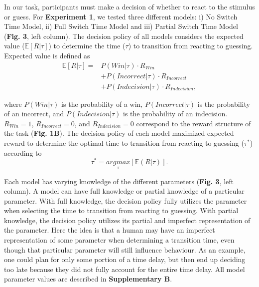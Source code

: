 \documentclass[12pt]{article}
\newcommand\boldblue[1]{\textcolor{mydarkblue}{\textbf{#1}}}
\begin{document}
\noindent In our task, participants must make a decision of whether to react to the stimulus or guess. For \boldblue{Experiment 1}, we tested three different models:  i) No Switch Time Model, ii) Full Switch Time Model and iii) Partial Switch Time Model (\boldblue{Fig. 3}, left column). The decision policy of all models considers the expected value ($\mathbb{E}[R|\tau]$) to determine the time ($\tau$) to transition from reacting to guessing. Expected value is defined as
\setlength{\belowdisplayskip}{4pt} \setlength{\belowdisplayshortskip}{4pt} %
\setlength{\abovedisplayskip}{4pt} \setlength{\abovedisplayshortskip}{4pt}
\begin{align}
    \mathbb{E}[R|\tau] = & P(Win|\tau) \cdot R_{Win} \nonumber \\ &+ P(Incorrect|\tau) \cdot R_{Incorrect} \nonumber \\ &+ P(Indecision|\tau) \cdot R_{Indecision},
\end{align}

\noindent where $P(Win|\tau)$ is the probability of a win, $P(Incorrect|\tau)$ is the probability of an incorrect, and $P(Indecision|\tau)$ is the probability of an indecision. $R_{Win} = 1$, $R_{Incorrect} = 0$, and $R_{Indecision} = 0$ correspond to the reward structure of the task (\boldblue{Fig. 1B}). The decision policy of each model maximized expected reward to determine the optimal time to transition from reacting to guessing ($\tau^*$) according to
\begin{equation}
    \tau^* = \underset{\tau}{argmax}[\mathbb{E}(R|\tau)].
\end{equation}

Each model has varying knowledge of the different parameters (\boldblue{Fig. 3}, left column). A model can have full knowledge or partial knowledge of a particular parameter. With full knowledge, the decision policy fully utilizes the parameter when selecting the time to transition from reacting to guessing. With partial knowledge, the decision policy utilizes its partial and imperfect representation of the parameter. Here the idea is that a human may have an imperfect representation of some parameter when determining a transition time, even though that particular parameter will still influence behaviour. As an example, one could plan for only some portion of a time delay, but then end up deciding too late because they did not fully account for the entire time delay. All model parameter values are described in \boldblue{Supplementary B}.
\end{document}
